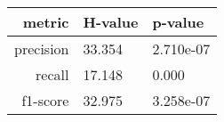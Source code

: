 \begin{tabular}{|r|l|l|}
  \hline
  metric & H-value & p-value \\
  \hline
  precision & 33.354 & 2.710e-07 \\
  \hline
  recall & 17.148 & 0.000 \\
  \hline
  f1-score & 32.975 & 3.258e-07 \\
  \hline
\end{tabular}
